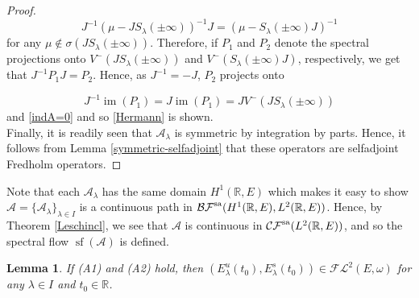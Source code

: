 \documentclass[a4paper,10pt]{article}
\newtheorem{lemma}[theorem]{Lemma}
\DeclareMathOperator{\im}{im}
\DeclareMathOperator{\sfl}{sf}
\begin{document}
\begin{proof}
\[J^{-1}(\mu-JS_\lambda(\pm\infty))^{-1}J=(\mu-S_\lambda(\pm\infty)J)^{-1}\]
for any $\mu\notin\sigma(JS_\lambda(\pm\infty))$. Therefore, if $P_1$ and $P_2$ denote the spectral projections onto \linebreak $V^-(JS_\lambda(\pm\infty))$ and $V^-(S_\lambda(\pm\infty)J)$, respectively, we get that $J^{-1}P_1J=P_2$. Hence, as $J^{-1}=-J$, $P_2$ projects onto 

\[J^{-1}\im(P_1)=J\im(P_1)=JV^-(JS_\lambda(\pm\infty))\]
and \eqref{indA=0} and so \eqref{Hermann} is shown.\\
Finally, it is readily seen that $\mathcal{A}_\lambda$ is symmetric by integration by parts. Hence, it follows from Lemma \ref{symmetric-selfadjoint} that these operators are selfadjoint Fredholm operators. 
\end{proof}
\noindent
Note that each $\mathcal{A}_\lambda$ has the same domain $H^1(\mathbb{R},E)$ which makes it easy to show $\mathcal{A}=\{\mathcal{A}_\lambda\}_{\lambda\in I}$ is a continuous path in $\mathcal{BF}^\textup{sa}(H^1(\mathbb{R},E),L^2(\mathbb{R},E))$. Hence, by Theorem \ref{Leschincl}, we see that $\mathcal{A}$ is continuous in $\mathcal{CF}^\textup{sa}(L^2(\mathbb{R},E))$, and so the spectral flow $\sfl(\mathcal{A})$ is defined.

\begin{lemma}\label{lemma-FL2}
If (A1) and (A2) hold, then $(E^u_\lambda(t_0),E^s_\lambda(t_0))\in\mathcal{FL}^2(E,\omega)$ for any $\lambda\in I$ and $t_0\in\mathbb{R}$.
\end{lemma}
\end{document}
